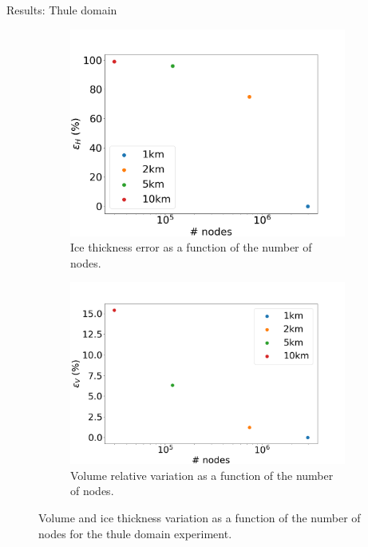 \documentclass[11pt]{beamer}
\begin{document}
\begin{frame}[allowframebreaks]{Results: Thule domain}
			\begin{figure}
				\centering
				\begin{subfigure}{.45\textwidth}
					\centering
					\includegraphics[width=1.1\linewidth]{../fig/H_THULE_full_all_res_vs_num_nodes.png}
					\caption{Ice thickness error as a function of the number of nodes.}
					\label{H_THULE_VS_NODES}
				\end{subfigure}
				\begin{subfigure}{.45\textwidth}
					\centering
					\includegraphics[width=1.1\linewidth]{../fig/Volume_THULE_full_all_res_vs_num_nodes.png}
					\caption{Volume relative variation as a function of the number of nodes.}
					\label{VOLUME_THULE_VS_NODES}
				\end{subfigure}
				\caption{Volume and ice thickness variation as a function of the number of nodes for the thule domain experiment.}

\end{figure}
\end{frame}
\end{document}
